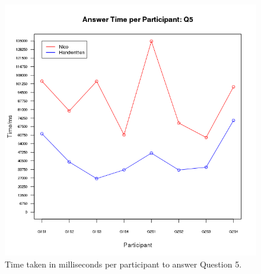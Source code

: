 \documentclass[12pt,twoside,notitlepage,xetex]{report}
\begin{document}
\begin{center}
\begin{figure}[H]
\begin{center}
\includegraphics[height=\textheight/2-2cm]{figs/graphs/q5.png}
\end{center}
\caption{Time taken in milliseconds per participant to answer Question 5.}
\end{figure}
\end{center}
\end{document}
